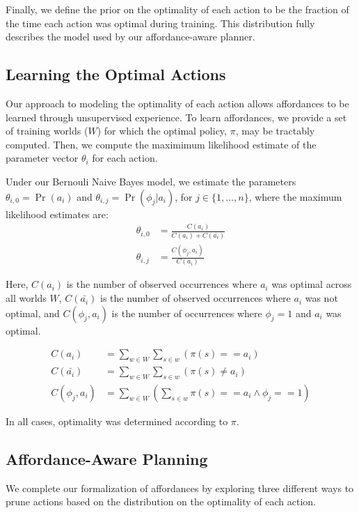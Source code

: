 \documentclass[letterpaper]{article}
\newcommand{\argmax}{\operatornamewithlimits{argmax}} %
\begin{document}
Finally, we define the prior on the optimality of each action to be the fraction of the
time each action was optimal during training. This distribution fully describes the model used by our affordance-aware planner. 

\subsection{Learning the Optimal Actions}
Our approach to modeling the optimality of each action allows affordances to be learned through unsupervised experience.
To learn affordances, we provide a set of training worlds ($W$) for which the optimal policy, $\pi$,
may be tractably computed. Then, we compute the maximimum likelihood estimate of the parameter vector $\theta_i$ for each action.

Under our Bernouli Naive Bayes model, we estimate the parameters
$\theta_{i,0} = \Pr(a_i)$ and $\theta_{i,j} = \Pr(\phi_j | a_i)$, for $j \in \{1, \ldots, n \}$, where the maximum likelihood estimates are:
\begin{align}
\theta_{i,0} &= \frac{C(a_i)}{C(a_i) + C(\bar{a_i})} \\
\theta_{i,j} &= \frac{C(\phi_j, a_i)}{C(a_i)}
\end{align}

Here, $C(a_i)$ is the number of observed occurrences where $a_i$ was optimal across all worlds $W$,
$C(\bar{a_i})$ is the number of observed occurrences where $a_i$ was not optimal,
and $C(\phi_j, a_i)$ is the number of occurrences where $\phi_j=1$ and $a_i$ was optimal.

\begin{align}
C(a_i) &= \sum_{w \in W} \sum_{s \in w} (\pi(s) == a_i) \\
C(\bar{a_i}) &= \sum_{w \in W} \sum_{s \in w} (\pi(s) \not= a_i) \\
C(\phi_j, a_i) &= \sum_{w \in W} (\sum_{s \in w} \pi(s) == a_i \wedge \phi_j == 1)
\end{align}

In all cases, optimality was determined according to $\pi$.

\subsection{Affordance-Aware Planning}
\label{sec:action_pruning}
We complete our formalization of affordances by exploring three different ways to prune actions
based on the distribution on the optimality of each action.
\end{document}
